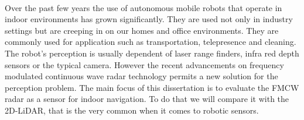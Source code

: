        
\EndTitlePage
\titlepage\ \endtitlepage %

\TitlePage
  \vspace*{55mm}
       {Over the past few years the use of autonomous mobile robots that operate in indoor environments has grown significantly. They are used not only in industry settings but are creeping in on our homes and office environments. They are commonly used for application such as transportation, telepresence and cleaning. The robot's perception is usually dependent of laser range finders, infra red depth sensors or the typical camera. However the recent advancements on frequency modulated continuous wave radar technology permits a new solution for the perception problem. 
       The main focus of this dissertation is to evaluate the \ac{FMCW} \ac{radar} as a sensor for indoor navigation.
        To do that we will compare it with the 2D-\ac{LiDAR}, that is the very common when it comes to robotic sensors.
       }
       \TEXT{}     
